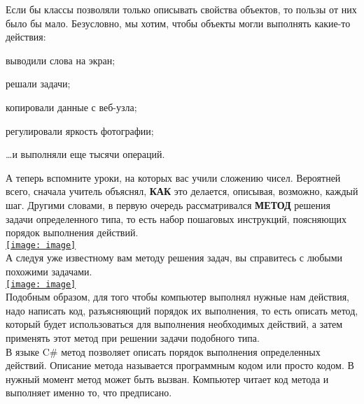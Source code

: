 \documentclass[12pt, a4paper]{article}
\begin{document}
Если бы классы позволяли только описывать свойства объектов, то пользы от них было бы мало. Безусловно, мы хотим, чтобы объекты могли выполнять какие-то действия:\\

\begin{itemize} {
\item{выводили слова на экран;}
\item{решали задачи;}
\item{копировали данные с веб-узла;}
\item{регулировали яркость фотографии;}
\item{…и выполняли еще тысячи операций.}
} \end{itemize}

А теперь вспомните уроки, на которых вас учили сложению чисел. Вероятней всего, сначала учитель объяснял, \textbf{КАК}  это делается, описывая, возможно, каждый шаг. Другими словами, в первую очередь рассматривался \textbf{МЕТОД}  решения задачи определенного типа, то есть набор пошаговых инструкций, поясняющих порядок выполнения действий.\\


\bigbreak \href{http://www.intuit.ru//EDI/25_09_16_1/1474755579-437/tutorial/590/objects/3/files/02-21.jpg}                         {\texttt{[image: image]}}\\



А следуя уже известному вам методу решения задач, вы справитесь с любыми похожими задачами.\\


\bigbreak \href{http://www.intuit.ru//EDI/25_09_16_1/1474755579-437/tutorial/590/objects/3/files/02-22.jpg}                         {\texttt{[image: image]}}\\



Подобным образом, для того чтобы компьютер выполнял нужные нам действия, надо написать код, разъясняющий порядок их выполнения, то есть описать метод, который будет использоваться для выполнения необходимых действий, а затем применять этот метод при решении задачи подобного типа.\\

В языке C\# метод позволяет описать порядок выполнения определенных действий. Описание метода называется программным кодом или просто кодом. В нужный момент метод может быть вызван. Компьютер читает код метода и выполняет именно то, что предписано.\\
\end{document}
